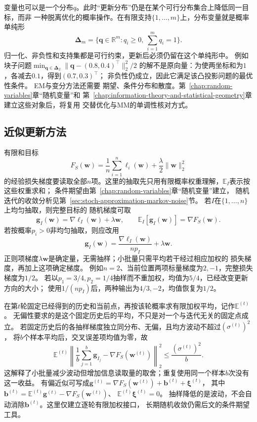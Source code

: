 变量也可以是一个分布$q$。此时“更新分布”仍是在某个可行分布集合上降低同一目标，而非
一种脱离优化的概率操作。在有限支持$\{1,\ldots,m\}$上，分布变量就是概率单纯形
\[
  \bm{\Delta}_m
  =\{\bm{q}\in\mathbb{R}^m:q_i\geq0,\ \sum_{i=1}^m q_i=1\}.
\]
归一化、非负性和支持集都是可行约束，更新后必须仍留在这个单纯形中。
例如块子问题$\min_{\bm q\in\bm\Delta_2}\|\bm q-(0.8,0.4)^\top\|_2^2/2$
的解不是原向量：为使两坐标和为$1$，各减去$0.1$，得到$(0.7,0.3)^\top$；
非负性仍成立，因此它满足该凸投影问题的最优性条件。
EM与变分方法还需要
期望、条件分布和散度。第~\ref{chap:random-variables}章“随机变量”和
第~\ref{chap:information-theory-and-statistical-geometry}章建立这些对象后，将复用
交替优化与MM的单调性核对方式。

\subsection{近似更新方法}
\label{sec:opt-stochastic-gradient-stability}

有限和目标
\[
  F_S(\bm{w})=\frac1n\sum_{i=1}^n\ell_i(\bm{w})
  +\frac{\lambda}{2}\lVert\bm{w}\rVert_2^2
\]
的经验损失梯度要读取全部$n$项。这里的抽取先只用有限概率权重理解，$\mathbb E_I$表示按这些权重求和；
条件期望由第~\ref{chap:random-variables}章“随机变量”建立，
随机迭代的收敛分析见第~\ref{sec:stoch-approximation-markov-noise}节。
若$I$在$\{1,\ldots,n\}$上均匀抽取，则完整目标的
随机梯度可取
\[
  \bm{g}_I(\bm{w})
  =\nabla\ell_I(\bm{w})+\lambda\bm{w},\qquad
  \mathbb{E}_I[\bm{g}_I(\bm{w})]
  =\nabla F_S(\bm{w}).
\]
若按概率$p_i>0$非均匀抽取，则应改用
\[
  \bm{g}_I(\bm{w})
  =\frac{\nabla\ell_I(\bm{w})}{np_I}+\lambda\bm{w}.
\]
正则项梯度$\lambda\bm{w}$是确定量，无需抽样；小批量只需平均若干经过相应加权的
损失梯度，再加上这项确定梯度。
例如$n=2$、当前位置两项标量梯度为$2,-1$，完整损失梯度为$1/2$。
若以$p_1=3/4,p_2=1/4$抽样而不重加权，均值为$5/4$，已经改变更新方向的大小；
使用$1/(np_I)$后，两种输出为$4/3,-2$，均值恢复为$1/2$。

在第$t$轮固定已经得到的历史和当前点，再按该轮概率求有限加权平均，记作$\mathbb E^{(t)}$。
无偏性要求的是这个固定历史后的平均，不只是对一个与迭代无关的固定点成立。
若固定历史后的各抽样梯度独立同分布、无偏，且均方波动不超过$(\sigma^{(t)})^2$，
将$b$个样本平均后，交叉误差项均值为零，故
\[
 \mathbb E^{(t)}\left\|\frac1b\sum_{j=1}^b\bm g_{I_j}
             -\nabla F_S(\bm w^{(t)})\right\|_2^2
 \leq\frac{(\sigma^{(t)})^2}{b}.
\]
这解释了小批量减少波动但增加信息读取量的取舍；重复使用同一个样本$b$次没有这一收益。
有偏近似可写成$\bm g^{(t)}=\nabla F_S(\bm w^{(t)})+\bm b^{(t)}+\bm\xi^{(t)}$，
其中$\bm b^{(t)}=\mathbb E^{(t)}\bm g^{(t)}-\nabla F_S(\bm w^{(t)})$、
$\mathbb E^{(t)}\bm\xi^{(t)}=0$。
抽样降低的是波动，不会自动消除$\bm b^{(t)}$。这里仅建立逐轮有限加权接口，
长期随机收敛仍需后文的条件期望工具。

